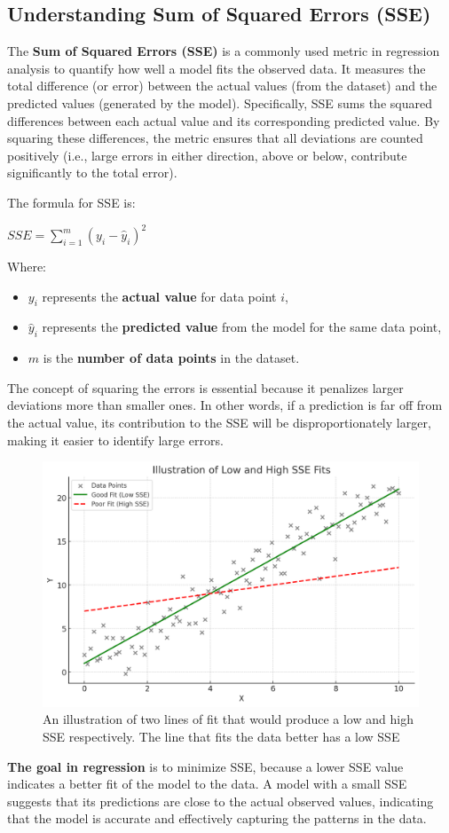 \subsection{Understanding Sum of Squared Errors (SSE)}
\begin{flushleft}
    \large The \textbf{Sum of Squared Errors (SSE)} is a commonly used metric in regression analysis to quantify how well a model fits the observed data. It measures the total difference (or error) between the actual values (from the dataset) and the predicted values (generated by the model). Specifically, SSE sums the squared differences between each actual value and its corresponding predicted value. By squaring these differences, the metric ensures that all deviations are counted positively (i.e., large errors in either direction, above or below, contribute significantly to the total error).

    The formula for SSE is:
    \begin{center}
        \( SSE = \sum_{i=1}^{m} (y_i - \hat{y}_i)^2 \)
    \end{center}
    
    Where:
    \begin{itemize}
        \item \( y_i \) represents the \textbf{actual value} for data point \( i \),
        \item \( \hat{y}_i \) represents the \textbf{predicted value} from the model for the same data point,
        \item \( m \) is the \textbf{number of data points} in the dataset.
    \end{itemize}

    The concept of squaring the errors is essential because it penalizes larger deviations more than smaller ones. In other words, if a prediction is far off from the actual value, its contribution to the SSE will be disproportionately larger, making it easier to identify large errors. \break

    \begin{figure}[H]
        \centering
        \includegraphics[width=0.45\linewidth]{ml/seefits.png}
        \caption{An illustration of two lines of fit that would produce a low and high SSE respectively. The line that fits the data better has a low SSE}
        \label{fig:seefits}
    \end{figure}

    \textbf{The goal in regression} is to minimize SSE, because a lower SSE value indicates a better fit of the model to the data. A model with a small SSE suggests that its predictions are close to the actual observed values, indicating that the model is accurate and effectively capturing the patterns in the data.
\end{flushleft}
